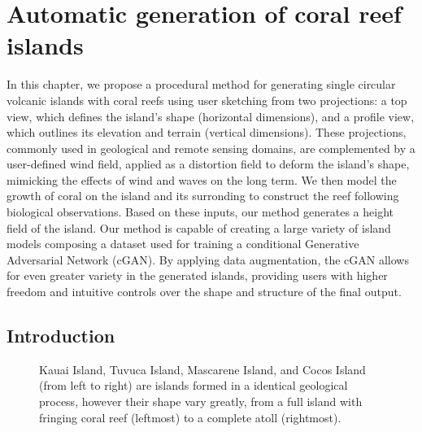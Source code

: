 \resetgraphicspath
{}


\chapter{Automatic generation of coral reef islands}
\label{chap:coral-island}

\abstract 
In this chapter, we propose a procedural method for generating single circular volcanic islands with coral reefs using user sketching from two projections: a top view, which defines the island's shape (horizontal dimensions), and a profile view, which outlines its elevation and terrain (vertical dimensions). These projections, commonly used in geological and remote sensing domains, are complemented by a user-defined wind field, applied as a distortion field to deform the island's shape, mimicking the effects of wind and waves on the long term. We then model the growth of coral on the island and its surronding to construct the reef following biological observations. Based on these inputs, our method generates a height field of the island. Our method is capable of creating a large variety of island models composing a dataset used for training a conditional Generative Adversarial Network (cGAN). By applying data augmentation, the cGAN allows for even greater variety in the generated islands, providing users with higher freedom and intuitive controls over the shape and structure of the final output.
\pagebreak 

\minitoc


\section{Introduction}
\label{sec:coral-island_introduction}

\begin{figure}[H]
    \caption{Kauai Island, Tuvuca Island, Mascarene Island, and Cocos Island (from left to right) are islands formed in a identical geological process, however their shape vary greatly, from a full island with fringing coral reef (leftmost) to a complete atoll (rightmost).}
    \label{fig:coral-island_island-examples}
\end{figure}


